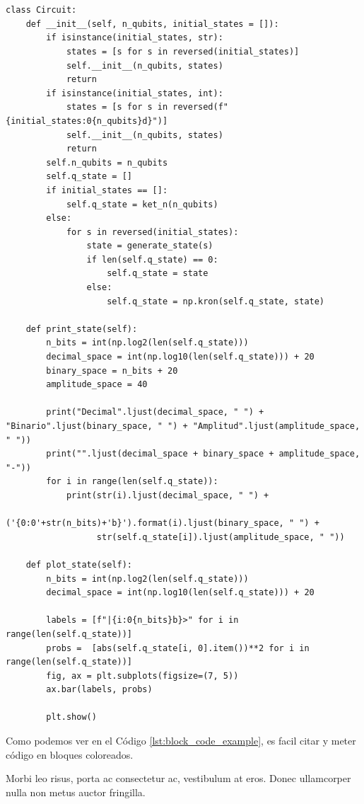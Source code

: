 \begin{lstlisting}[caption={Block code example}, label={lst:block_code_example}]

       
class Circuit:
    def __init__(self, n_qubits, initial_states = []):
        if isinstance(initial_states, str):
            states = [s for s in reversed(initial_states)]
            self.__init__(n_qubits, states)
            return
        if isinstance(initial_states, int):
            states = [s for s in reversed(f"{initial_states:0{n_qubits}d}")]
            self.__init__(n_qubits, states)
            return       
        self.n_qubits = n_qubits
        self.q_state = []
        if initial_states == []:
            self.q_state = ket_n(n_qubits)
        else:
            for s in reversed(initial_states):
                state = generate_state(s)
                if len(self.q_state) == 0:
                    self.q_state = state
                else:
                    self.q_state = np.kron(self.q_state, state)

    def print_state(self):
        n_bits = int(np.log2(len(self.q_state)))
        decimal_space = int(np.log10(len(self.q_state))) + 20
        binary_space = n_bits + 20
        amplitude_space = 40
    
        print("Decimal".ljust(decimal_space, " ") + "Binario".ljust(binary_space, " ") + "Amplitud".ljust(amplitude_space, " "))
        print("".ljust(decimal_space + binary_space + amplitude_space, "-"))
        for i in range(len(self.q_state)):        
            print(str(i).ljust(decimal_space, " ") + 
                  ('{0:0'+str(n_bits)+'b}').format(i).ljust(binary_space, " ") + 
                  str(self.q_state[i]).ljust(amplitude_space, " "))

    def plot_state(self):
        n_bits = int(np.log2(len(self.q_state)))
        decimal_space = int(np.log10(len(self.q_state))) + 20

        labels = [f"|{i:0{n_bits}b}>" for i in range(len(self.q_state))]
        probs =  [abs(self.q_state[i, 0].item())**2 for i in range(len(self.q_state))]
        fig, ax = plt.subplots(figsize=(7, 5))
        ax.bar(labels, probs)
        
        plt.show()
\end{lstlisting}

Como podemos ver en el Código \ref{lst:block_code_example}, es facil citar y meter código en bloques coloreados.

Morbi leo risus, porta ac consectetur ac, vestibulum at eros. Donec ullamcorper nulla non metus auctor fringilla.

